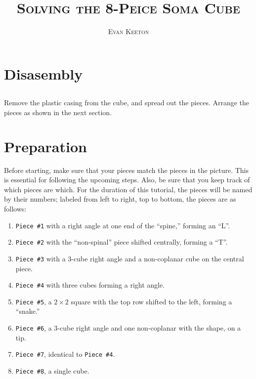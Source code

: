 \documentclass[11pt, twoside]{article}
\title{\textsc{Solving the 8-Peice Soma Cube}}
\author{\textsc{Evan Keeton}}
\date{}
\providecommand{\tightlist}{\setlength{\itemsep}{0pt}\setlength{\parskip}{0pt}}
\begin{document}
  \maketitle

  \section{Disasembly}
    \subsection{}
      Remove the plastic casing from the cube, and spread out the pieces.
        Arrange the pieces as shown in the next section.

  \section{Preparation}
    \begin{center}
    \end{center}

    Before starting, make sure that your pieces match the pieces in the picture. This is essential for
      following the upcoming steps. Also, be sure that you keep track of which pieces are which. For the
      duration of this tutorial, the pieces will be named by their numbers; labeled from left to right,
      top to bottom, the pieces are as follows:

    \begin{enumerate}
      \tightlist
      \item \texttt{Piece \#1} with a right angle at one end of the ``spine,'' forming an ``L''.
      \item \texttt{Piece \#2} with the ``non-spinal'' piece shifted centrally, forming a ``T''.
      \item \texttt{Piece \#3} with a 3-cube right angle and a non-coplanar cube on the central piece.
      \item \texttt{Piece \#4} with three cubes forming a right angle.
      \item \texttt{Piece \#5}, a $2\times2$ square with the top row shifted to the left, forming a ``snake.''
      \item \texttt{Piece \#6}, a 3-cube right angle and one non-coplanar with the shape, on a tip.
      \item \texttt{Piece \#7}, identical to \texttt{Piece \#4}.
      \item \texttt{Piece \#8}, a single cube.
    \end{enumerate}
\end{document}
